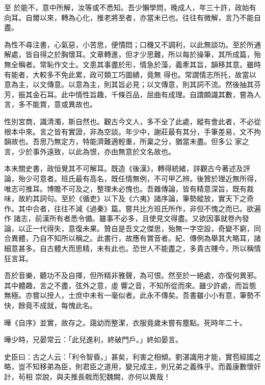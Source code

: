 \begin{pinyinscope}
 至
 於能不，意中所解，汝等或不悉知。吾少懶學問，晚成人，年三十許，政始有向耳。自爾以來，轉為心化，推老將至者，亦當未已也。往往有微解，言乃不能自盡。



 為性不尋注書，心氣惡，小苦思，便憒悶；口機又不調利，以此無談功。至於所通解處，皆自得之於胸懷耳。文章轉進，但才少思難，所以每於操筆，其所成篇，殆無全稱者。常恥作文士。文患其事盡於形，情急於藻，義牽其旨，韻移其意。雖時有能者，大較多不免此累，政可類工巧圖繢，竟無
 得也。常謂情志所托，故當以意為主，以文傳意。以意為主，則其旨必見；以文傳意，則其詞不流。然後抽其芬芳，振其金石耳。此中情性旨趣，千條百品，屈曲有成理。自謂頗識其數，嘗為人言，多不能賞，意或異故也。



 性別宮商，識清濁，斯自然也。觀古今文人，多不全了此處，縱有會此者，不必從根本中來。言之皆有實證，非為空談。年少中，謝莊最有其分，手筆差易，文不拘韻故也。吾思乃無定方，特能濟難適輕重，所稟之分，猶當未盡。但多公
 家之言，少於事外遠致，以此為恨，亦由無意於文名故也。



 本未關史書，政恒覺其不可解耳。既造《後漢》，轉得統緒，詳觀古今著述及評論，殆少可意者。班氏最有高名，既任情無例，不可甲乙辨。後贊於理近無所得，唯志可推耳。博贍不可及之，整理未必愧也。吾雜傳論，皆有精意深旨，既有裁味，故約其詞句。至於《循吏》以下及《六夷》諸序論，筆勢縱放，實天下之奇作。其中合者，往往不減《過秦》篇。嘗共比方班氏所作，非但不愧之而已。欲遍作
 諸志，前漢所有者悉令備。雖事不必多，且使見文得盡。又欲因事就卷內發論，以正一代得失，意復未果。贊自是吾文之傑思，殆無一字空設，奇變不窮，同合異體，乃自不知所以稱之。此書行，故應有賞音者。紀、傳例為舉其大略耳，諸細意甚多。自古體大而思精，未有此也。恐世人不能盡之，多貴古賤今，所以稱情狂言耳。



 吾於音樂，聽功不及自揮，但所精非雅聲，為可恨。然至於一絕處，亦復何異邪。其中體趣，言之不盡，弦外之意，虛
 響之音，不知所從而來。雖少許處，而旨態無極。亦嘗以授人，士庶中未有一毫似者。此永不傳矣。吾書雖小小有意，筆勢不快，餘竟不成就，每愧此名。



 曄《自序》並實，故存之。藹幼而整潔，衣服竟歲未嘗有塵點。死時年二十。



 曄少時，兄晏常云：「此兒進利，終破門戶。」終如晏言。



 史臣曰：古之人云：「利令智昏。」甚矣，利害之相傾。劉湛識用才能，實苞經國之略，豈不知移弟為臣，則君臣之道用，變兄成主，則兄弟之義殊乎。而義康數懷奸計，茍相
 崇說，與夫推長戟而犯魏闕，亦何以異哉！



\end{pinyinscope}